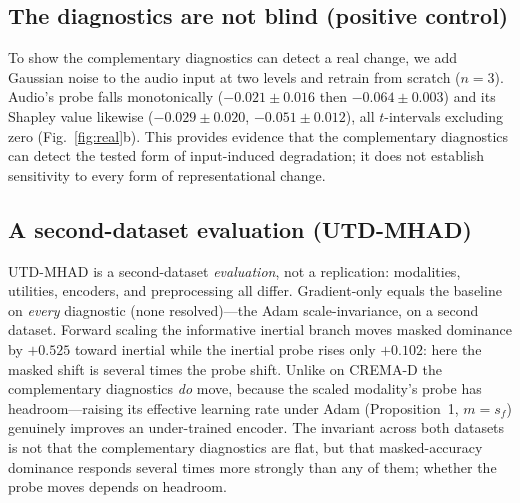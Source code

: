 \documentclass[conference]{IEEEtran}
\begin{document}
\subsection{The diagnostics are not blind (positive control)}
To show the complementary diagnostics can detect a real change, we add Gaussian noise to the audio input at two levels and retrain from scratch ($n{=}3$). Audio's probe falls monotonically ($-0.021\!\pm\!0.016$ then $-0.064\!\pm\!0.003$) and its Shapley value likewise ($-0.029\!\pm\!0.020$, $-0.051\!\pm\!0.012$), all $t$-intervals excluding zero (Fig.~\ref{fig:real}b). This provides evidence that the complementary diagnostics can detect the tested form of input-induced degradation; it does not establish sensitivity to every form of representational change.

\subsection{A second-dataset evaluation (UTD-MHAD)}
UTD-MHAD is a second-dataset \emph{evaluation}, not a replication: modalities, utilities, encoders, and preprocessing all differ. Gradient-only equals the baseline on \emph{every} diagnostic (none resolved)---the Adam scale-invariance, on a second dataset. Forward scaling the informative inertial branch moves masked dominance by $+0.525$ toward inertial while the inertial probe rises only $+0.102$: here the masked shift is several times the probe shift. Unlike on CREMA-D the complementary diagnostics \emph{do} move, because the scaled modality's probe has headroom---raising its effective learning rate under Adam (Proposition~1, $m{=}s_f$) genuinely improves an under-trained encoder. The invariant across both datasets is not that the complementary diagnostics are flat, but that masked-accuracy dominance responds several times more strongly than any of them; whether the probe moves depends on headroom.
\end{document}
